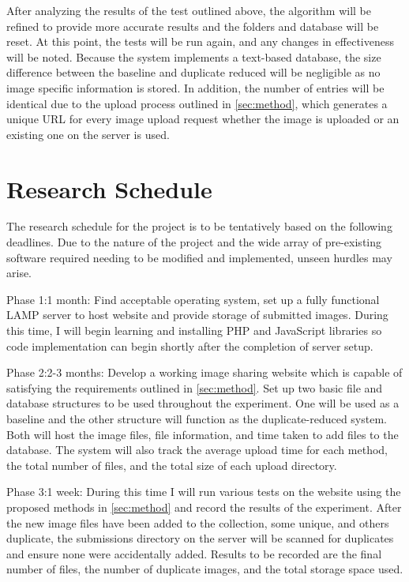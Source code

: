 \documentclass[11pt]{article}
\begin{document}
After analyzing the results of the test outlined above, the algorithm will be refined to provide more accurate results and the folders and database will be reset. At this point, the tests will be run again, and any changes in effectiveness will be noted. Because the system implements a text-based database, the size difference between the baseline and duplicate reduced will be negligible as no image specific information is stored. In addition, the number of entries will be identical due to the upload process outlined in \ref{sec:method}, which generates a unique URL for every image upload request whether the image is uploaded or an existing one on the server is used.

\vspace*{-.1in}
\section{Research Schedule}
\label{sec:schedule}
\vspace*{-.1in}

The research schedule for the project is to be tentatively based on the following deadlines.
Due to the nature of the project and the wide array of pre-existing software required needing to
be modified and implemented, unseen hurdles may arise.

Phase 1:1 month: Find acceptable operating system, set up a fully functional LAMP server to host website and provide storage of submitted images. During this time, I will begin learning and installing PHP and JavaScript libraries so code implementation can begin shortly after the completion of server setup.

Phase 2:2-3 months: Develop a working image sharing website which is capable of satisfying the requirements
outlined in \ref{sec:method}. Set up two basic file and database structures to be used throughout the experiment. One will be used as a baseline and the other structure will function as the duplicate-reduced system. Both will host the image files, file information, and time taken to add files to the database. The system will also track the average upload time for each method, the total number of files, and the total size of each upload directory.

Phase 3:1 week: During this time I will run various tests on the website using the proposed
methods in \ref{sec:method} and record the results of the experiment. After the new image files have been added to the collection, some unique, and others duplicate, the submissions directory on the server will be scanned for  duplicates and ensure none were accidentally added. Results to be recorded are the final number of files, the number of duplicate images, and the total storage space used.
\end{document}
